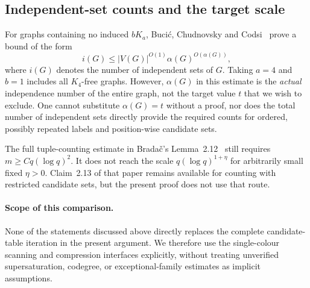 \documentclass[11pt]{article}
\theoremstyle{definition}
\theoremstyle{remark}
\begin{document}
\subsection{Independent-set counts and the target scale}

For graphs containing no induced $bK_a$, Buci\'{c}, Chudnovsky and
Codsi~\cite[Theorem~1]{BCC} prove a bound of the form
\[
 i(G)\le |V(G)|^{O(1)}\alpha(G)^{O(\alpha(G))},
\]
where $i(G)$ denotes the number of independent sets of $G$. Taking
$a=4$ and $b=1$ includes all $K_4$-free graphs. However, $\alpha(G)$ in
this estimate is the \emph{actual} independence number of the entire
graph, not the target value $t$ that we wish to exclude. One cannot
substitute $\alpha(G)=t$ without a proof, nor does the total number of
independent sets directly provide the required counts for ordered,
possibly repeated labels and position-wise candidate sets.

The full tuple-counting estimate in Brada\v{c}'s
Lemma~2.12~\cite{Bradac} still requires $m\ge Cq(\log q)^2$. It does
not reach the scale $q(\log q)^{1+\eta}$ for arbitrarily small fixed
$\eta>0$. Claim~2.13 of that paper remains available for counting with
restricted candidate sets, but the present proof does not use that
route.

\paragraph{Scope of this comparison.}
None of the statements discussed above directly replaces the complete
candidate-table iteration in the present argument. We therefore use
the single-colour scanning and compression interfaces explicitly,
without treating unverified supersaturation, codegree, or
exceptional-family estimates as implicit assumptions.
\end{document}
